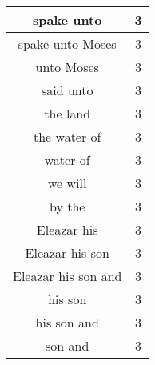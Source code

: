 \begin{center}
\begin{longtable}{|c|c|}
spake unto & 3\\ \hline 
spake unto Moses & 3\\ \hline 
unto Moses & 3\\ \hline 
said unto & 3\\ \hline 
the land & 3\\ \hline 
the water of & 3\\ \hline 
water of & 3\\ \hline 
we will & 3\\ \hline 
by the & 3\\ \hline 
Eleazar his & 3\\ \hline 
Eleazar his son & 3\\ \hline 
Eleazar his son and & 3\\ \hline 
his son & 3\\ \hline 
his son and & 3\\ \hline 
son and & 3\\ \hline 
\end{longtable}
\end{center}





